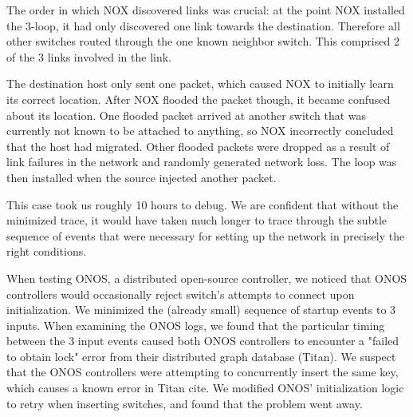 The order in which NOX discovered links was crucial: at the point NOX
installed the 3-loop, it had only discovered one link towards the destination.
Therefore all other switches routed through the one known neighbor switch.
This comprised 2 of the 3 links involved in the link.

The destination host only sent one packet, which caused NOX to initially learn
its correct location. After NOX flooded the packet though, it became confused
about its location. One flooded packet arrived at
another switch that was currently not known to be attached to anything, so NOX
incorrectly concluded that the host had migrated. Other flooded packets were
dropped as a result of link failures in the network and randomly generated
network loss. The loop was then installed when the source injected another
packet.

This case took us roughly 10 hours to debug. We are confident that without the
minimized trace, it would have taken much
longer to trace through the subtle sequence of events that were necessary for
setting up the network in precisely the right conditions.


 When testing ONOS, a
distributed open-source controller, we noticed that ONOS controllers would
occasionally reject switch's attempts to connect upon initialization.
We minimized the (already small) sequence of startup events to 3 inputs.
When examining the ONOS logs, we found that the particular timing between the 3
input events caused both ONOS controllers to encounter a "failed to obtain
lock" error from their distributed graph database (Titan). We suspect that the ONOS controllers
were attempting to concurrently insert the same key, which causes a known
error in Titan \num{cite}.
We modified ONOS' initialization logic to retry when inserting switches,
and found that the problem went away.

